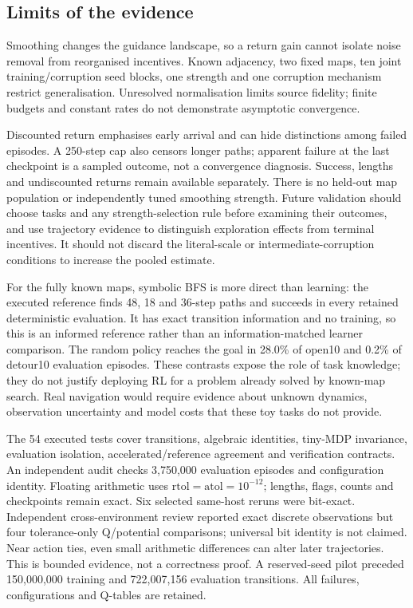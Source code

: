 \documentclass{COMPXXXX}
\begin{document}
\subsection{Limits of the evidence}
Smoothing changes the guidance landscape, so a return gain cannot isolate noise removal from reorganised incentives. Known adjacency, two fixed maps, ten joint training/corruption seed blocks, one strength and one corruption mechanism restrict generalisation. Unresolved normalisation limits source fidelity; finite budgets and constant rates do not demonstrate asymptotic convergence.

Discounted return emphasises early arrival and can hide distinctions among failed episodes. A 250-step cap also censors longer paths; apparent failure at the last checkpoint is a sampled outcome, not a convergence diagnosis. Success, lengths and undiscounted returns remain available separately. There is no held-out map population or independently tuned smoothing strength. Future validation should choose tasks and any strength-selection rule before examining their outcomes, and use trajectory evidence to distinguish exploration effects from terminal incentives. It should not discard the literal-scale or intermediate-corruption conditions to increase the pooled estimate.

For the fully known maps, symbolic BFS is more direct than learning: the executed reference finds 48, 18 and 36-step paths and succeeds in every retained deterministic evaluation. It has exact transition information and no training, so this is an informed reference rather than an information-matched learner comparison. The random policy reaches the goal in 28.0\% of open10 and 0.2\% of detour10 evaluation episodes. These contrasts expose the role of task knowledge; they do not justify deploying RL for a problem already solved by known-map search. Real navigation would require evidence about unknown dynamics, observation uncertainty and model costs that these toy tasks do not provide.

The 54 executed tests cover transitions, algebraic identities, tiny-MDP invariance, evaluation isolation, accelerated/reference agreement and verification contracts. An independent audit checks 3,750,000 evaluation episodes and configuration identity. Floating arithmetic uses $\mathrm{rtol}=\mathrm{atol}=10^{-12}$; lengths, flags, counts and checkpoints remain exact. Six selected same-host reruns were bit-exact. Independent cross-environment review reported exact discrete observations but four tolerance-only Q/potential comparisons; universal bit identity is not claimed. Near action ties, even small arithmetic differences can alter later trajectories. This is bounded evidence, not a correctness proof. A reserved-seed pilot preceded 150,000,000 training and 722,007,156 evaluation transitions. All failures, configurations and Q-tables are retained.
\end{document}
